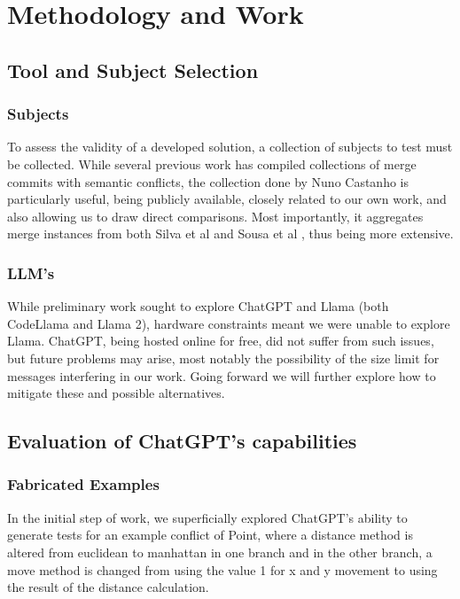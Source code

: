 \chapter{Methodology and Work}\label{chap:chap3}

\section{Tool and Subject Selection}

\subsection{Subjects}

To assess the validity of a developed solution, a collection of subjects to test must be collected. While several previous work has compiled collections of merge commits with semantic conflicts, the collection done by Nuno Castanho \cite{kn:nuno} is particularly useful, being publicly available, closely related to our own work, and also allowing us to draw direct comparisons. Most importantly, it aggregates merge instances from both Silva et al \cite{kn:leuson} and Sousa et al \cite{kn:safemerge}, thus being more extensive.

\subsection{LLM's}

While preliminary work sought to explore ChatGPT and Llama (both CodeLlama and Llama 2), hardware constraints meant we were unable to explore Llama. ChatGPT, being hosted online for free, did not suffer from such issues, but future problems may arise, most notably the possibility of the size limit for messages interfering in our work. Going forward we will further explore how to mitigate these and possible alternatives.

\section{Evaluation of ChatGPT's capabilities}

\subsection{Fabricated Examples}

In the initial step of work, we superficially explored ChatGPT's ability to generate tests for an example conflict of Point, where a distance method is altered from euclidean to manhattan in one branch and in the other branch, a move method is changed from using the value 1 for x and y movement to using the result of the distance calculation.

